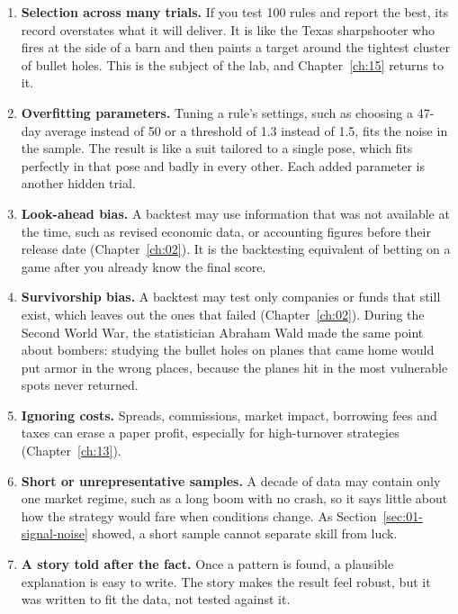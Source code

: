 \begin{enumerate}
  \item \textbf{Selection across many trials.} If you test 100 rules and report the best, its record overstates what it will deliver. It is like the Texas sharpshooter who fires at the side of a barn and then paints a target around the tightest cluster of bullet holes. This is the subject of the lab, and Chapter~\ref{ch:15} returns to it.
  \item \textbf{Overfitting parameters.} Tuning a rule's settings, such as choosing a 47-day average instead of 50 or a threshold of 1.3 instead of 1.5, fits the noise in the sample. The result is like a suit tailored to a single pose, which fits perfectly in that pose and badly in every other. Each added parameter is another hidden trial.
  \item \textbf{Look-ahead bias.} A backtest may use information that was not available at the time, such as revised economic data, or accounting figures before their release date (Chapter~\ref{ch:02}). It is the backtesting equivalent of betting on a game after you already know the final score.
  \item \textbf{Survivorship bias.} A backtest may test only companies or funds that still exist, which leaves out the ones that failed (Chapter~\ref{ch:02}). During the Second World War, the statistician Abraham Wald made the same point about bombers: studying the bullet holes on planes that came home would put armor in the wrong places, because the planes hit in the most vulnerable spots never returned.
  \item \textbf{Ignoring costs.} Spreads, commissions, market impact, borrowing fees and taxes can erase a paper profit, especially for high-turnover strategies (Chapter~\ref{ch:13}).
  \item \textbf{Short or unrepresentative samples.} A decade of data may contain only one market regime, such as a long boom with no crash, so it says little about how the strategy would fare when conditions change. As Section~\ref{sec:01-signal-noise} showed, a short sample cannot separate skill from luck.
  \item \textbf{A story told after the fact.} Once a pattern is found, a plausible explanation is easy to write. The story makes the result feel robust, but it was written to fit the data, not tested against it.
\end{enumerate}

